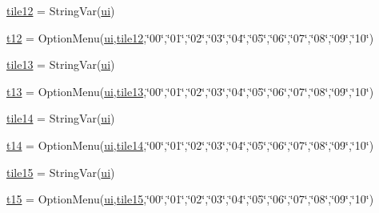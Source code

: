 \begin{DoxyCompactItemize}
\item 
\mbox{\hyperlink{namespacegui_ae3a967cdb231db565ecb3d01cc1742c6}{tile12}} = String\+Var(\mbox{\hyperlink{namespacegui_a40ab7281456eadbea2dc2038f5c24fa1}{ui}})
\item 
\mbox{\hyperlink{namespacegui_a83d79dd79b185deb01e172ec4188fa17}{t12}} = Option\+Menu(\mbox{\hyperlink{namespacegui_a40ab7281456eadbea2dc2038f5c24fa1}{ui}},\mbox{\hyperlink{namespacegui_ae3a967cdb231db565ecb3d01cc1742c6}{tile12}},\char`\"{}00\char`\"{},\char`\"{}01\char`\"{},\char`\"{}02\char`\"{},\char`\"{}03\char`\"{},\char`\"{}04\char`\"{},\char`\"{}05\char`\"{},\char`\"{}06\char`\"{},\char`\"{}07\char`\"{},\char`\"{}08\char`\"{},\char`\"{}09\char`\"{},\char`\"{}10\char`\"{})
\item 
\mbox{\hyperlink{namespacegui_ab62f6b286631ccfcc67e468618513305}{tile13}} = String\+Var(\mbox{\hyperlink{namespacegui_a40ab7281456eadbea2dc2038f5c24fa1}{ui}})
\item 
\mbox{\hyperlink{namespacegui_a118e7894907edd8ca19acc560b717a9b}{t13}} = Option\+Menu(\mbox{\hyperlink{namespacegui_a40ab7281456eadbea2dc2038f5c24fa1}{ui}},\mbox{\hyperlink{namespacegui_ab62f6b286631ccfcc67e468618513305}{tile13}},\char`\"{}00\char`\"{},\char`\"{}01\char`\"{},\char`\"{}02\char`\"{},\char`\"{}03\char`\"{},\char`\"{}04\char`\"{},\char`\"{}05\char`\"{},\char`\"{}06\char`\"{},\char`\"{}07\char`\"{},\char`\"{}08\char`\"{},\char`\"{}09\char`\"{},\char`\"{}10\char`\"{})
\item 
\mbox{\hyperlink{namespacegui_a5cf77212c983a05affbe474cb1364620}{tile14}} = String\+Var(\mbox{\hyperlink{namespacegui_a40ab7281456eadbea2dc2038f5c24fa1}{ui}})
\item 
\mbox{\hyperlink{namespacegui_a69a6fe1ecfb625203761aef0d5d54058}{t14}} = Option\+Menu(\mbox{\hyperlink{namespacegui_a40ab7281456eadbea2dc2038f5c24fa1}{ui}},\mbox{\hyperlink{namespacegui_a5cf77212c983a05affbe474cb1364620}{tile14}},\char`\"{}00\char`\"{},\char`\"{}01\char`\"{},\char`\"{}02\char`\"{},\char`\"{}03\char`\"{},\char`\"{}04\char`\"{},\char`\"{}05\char`\"{},\char`\"{}06\char`\"{},\char`\"{}07\char`\"{},\char`\"{}08\char`\"{},\char`\"{}09\char`\"{},\char`\"{}10\char`\"{})
\item 
\mbox{\hyperlink{namespacegui_a4e71059635ebf9d3f27d42d153a8cd3b}{tile15}} = String\+Var(\mbox{\hyperlink{namespacegui_a40ab7281456eadbea2dc2038f5c24fa1}{ui}})
\item 
\mbox{\hyperlink{namespacegui_a3ced2b879aca16d02ca39dc98473f8db}{t15}} = Option\+Menu(\mbox{\hyperlink{namespacegui_a40ab7281456eadbea2dc2038f5c24fa1}{ui}},\mbox{\hyperlink{namespacegui_a4e71059635ebf9d3f27d42d153a8cd3b}{tile15}},\char`\"{}00\char`\"{},\char`\"{}01\char`\"{},\char`\"{}02\char`\"{},\char`\"{}03\char`\"{},\char`\"{}04\char`\"{},\char`\"{}05\char`\"{},\char`\"{}06\char`\"{},\char`\"{}07\char`\"{},\char`\"{}08\char`\"{},\char`\"{}09\char`\"{},\char`\"{}10\char`\"{})

\end{DoxyCompactItemize}
